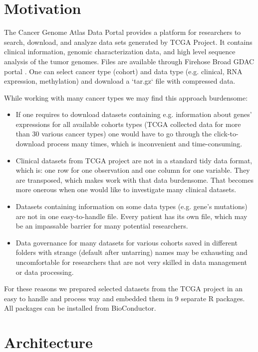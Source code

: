 \documentclass{bioinfo}
\begin{document}
\section*{Motivation}
The Cancer Genome Atlas Data Portal provides a platform for researchers to search, download, and analyze data sets generated by TCGA Project. It contains clinical information, genomic characterization data, and high level sequence analysis of the tumor genomes. Files are available through Firehose Broad GDAC portal \citep{broad}. One can select cancer type (cohort) and data type (e.g. clinical, RNA expression, methylation) and download a `tar.gz` file with compressed data. 

While working with many cancer types we may find this approach burdensome:

\begin{itemize}
\item If one requires to download datasets containing e.g. information about genes' expressions for all available cohorts types (TCGA collected data for more than 30 various cancer types) one would have to go through the click-to-download process many times, which is inconvenient and time-consuming.
\item Clinical datasets from TCGA project are not in a standard tidy data format, which is: one row for one observation and one column for one variable. They are transposed, which makes work with that data burdensome. That becomes more onerous when one would like to investigate many clinical datasets.
\item Datasets containing information on some data types (e.g. gene's mutations) are not in one easy-to-handle file. Every patient has its own file, which may be an impassable barrier for many potential researchers. 
\item Data governance for many datasets for various cohorts saved in different folders with strange (default after untarring) names may be exhausting and uncomfortable for researchers that are not very skilled in data management or data processing.
\end{itemize}
For these reasons we prepared selected datasets from the TCGA project in an easy to handle and process way and embedded them in 9 separate R packages. All packages can be installed from BioConductor.

\section*{Architecture}
\end{document}

